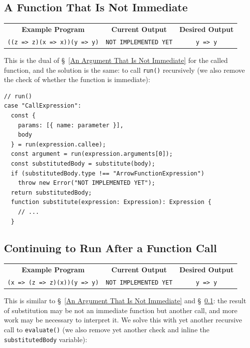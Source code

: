 \documentclass[12pt, oneside]{book}
\begin{document}
\subsection{A Function That Is Not Immediate}
\label{A Function That Is Not Immediate}

\begin{center}
\begin{tabular}{c|c|c}
\textbf{Example Program} & \textbf{Current Output} & \textbf{Desired Output} \\
\texttt{((z => z)(x => x))(y => y)} & \texttt{NOT IMPLEMENTED YET} & \texttt{y => y} \\
\end{tabular}
\end{center}

This is the dual of §~\ref{An Argument That Is Not Immediate} for the called function, and the solution is the same: to call \texttt{run()} recursively (we also remove the check of whether the function is immediate):

\begin{verbatim}
// run()
case "CallExpression":
  const {
    params: [{ name: parameter }],
    body
  } = run(expression.callee);
  const argument = run(expression.arguments[0]);
  const substitutedBody = substitute(body);
  if (substitutedBody.type !== "ArrowFunctionExpression")
    throw new Error("NOT IMPLEMENTED YET");
  return substitutedBody;
  function substitute(expression: Expression): Expression {
    // ...
  }
\end{verbatim}

\subsection{Continuing to Run After a Function Call}
\label{Continuing to Run After a Function Call}

\begin{center}
\begin{tabular}{c|c|c}
\textbf{Example Program} & \textbf{Current Output} & \textbf{Desired Output} \\
\texttt{(x => (z => z)(x))(y => y)} & \texttt{NOT IMPLEMENTED YET} & \texttt{y => y} \\
\end{tabular}
\end{center}

This is similar to §~\ref{An Argument That Is Not Immediate} and §~\ref{A Function That Is Not Immediate}: the result of substitution may be not an immediate function but another call, and more work may be necessary to interpret it. We solve this with yet another recursive call to \texttt{evaluate()} (we also remove yet another check and inline the \texttt{substitutedBody} variable):
\end{document}
